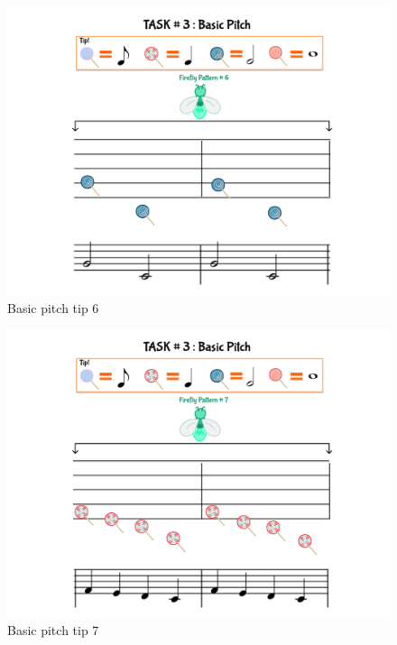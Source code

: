 \begin{figure}[H]
    \centering
    \includegraphics[width=12cm]{figures/NewFigures/BasicPitchTip6.png}
    \caption{Basic pitch tip 6}
    \label{fig:BasicPitchTip6}
\end{figure}

\begin{figure}[H]
    \centering
    \includegraphics[width=12cm]{figures/NewFigures/BasicPitchTip7.png}
    \caption{Basic pitch tip 7}
    \label{fig:BasicPitchTip7}
\end{figure}

